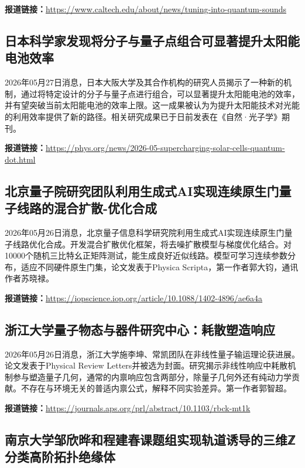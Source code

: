 \documentclass[12pt,a4paper]{ctexart}
\begin{document}
\noindent\textbf{报道链接：}\url{https://www.caltech.edu/about/news/tuning-into-quantum-sounds}

\subsection{ 日本科学家发现将分子与量子点组合可显著提升太阳能电池效率 }

2026年05月27日消息，日本大阪大学及其合作机构的研究人员揭示了一种新的机制，通过将特定设计的分子与量子点进行组合，可以显著提升太阳能电池的效率，并有望突破当前太阳能电池的效率上限。这一成果被认为为提升太阳能技术对光能的利用效率提供了新的路径。相关研究成果已于日前发表在《自然·光子学》期刊。

\noindent\textbf{报道链接：}\url{https://phys.org/news/2026-05-supercharging-solar-cells-quantum-dot.html}

\subsection{ 北京量子院研究团队利用生成式AI实现连续原生门量子线路的混合扩散-优化合成 }

2026年05月26日消息，北京量子信息科学研究院利用生成式AI实现连续原生门量子线路优化合成。开发混合扩散优化框架，将去噪扩散模型与梯度优化结合。对10000个随机三比特幺正矩阵测试，能生成良好近似线路。模型可学习连续参数分布，适应不同硬件原生门集，论文发表于Physica Scripta，第一作者郭大钧，通讯作者苏晓禄。

\noindent\textbf{报道链接：}\url{https://iopscience.iop.org/article/10.1088/1402-4896/ae6a4a}

\subsection{ 浙江大学量子物态与器件研究中心：耗散塑造响应 }

2026年05月26日消息，浙江大学施李坤、常凯团队在非线性量子输运理论获进展。论文发表于Physical Review Letters并被选为封面。研究揭示非线性响应中耗散机制参与塑造量子几何，通常的内禀响应包含两部分，除量子几何外还有纯动力学贡献。不存在与环境无关的普适内禀公式，解释不同实验差异。第一作者郭智超。

\noindent\textbf{报道链接：}\url{https://journals.aps.org/prl/abstract/10.1103/rbck-mt1k}

\subsection{ 南京大学邹欣晔和程建春课题组实现轨道诱导的三维ℤ分类高阶拓扑绝缘体 }
\end{document}
